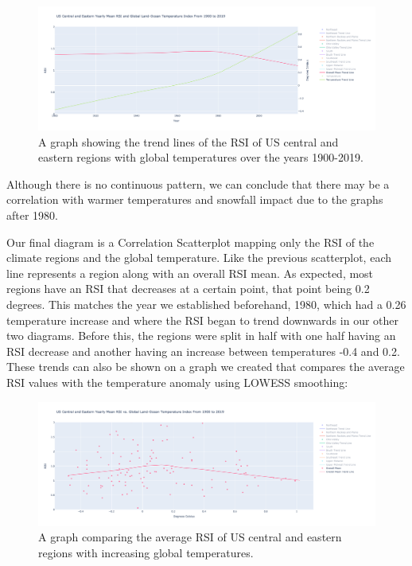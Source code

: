 \documentclass[fontsize=11pt]{article}
\begin{document}
\begin{figure}[h]
    \centering 
    \includegraphics[scale=.2]{year_comparison_scatter_plot_summary_wide.png}
    \caption{A graph showing the trend lines of the RSI of US central and eastern regions with global temperatures over the years 1900-2019.}
    \label{fig:my_label}
\end{figure}

Although there is no continuous pattern, we can conclude that there may be a correlation with warmer temperatures and snowfall impact due to the graphs after 1980.

Our final diagram is a Correlation Scatterplot mapping only the RSI of the climate regions and the global temperature. Like the previous scatterplot, each line represents a region along with an overall RSI mean. As expected, most regions have an RSI that decreases at a certain point, that point being 0.2 degrees. This matches the year we established beforehand, 1980, which had a 0.26 temperature increase and where the RSI began to trend downwards in our other two diagrams. Before this, the regions were split in half with one half having an RSI decrease and another having an increase between temperatures -0.4 and 0.2. These trends can also be shown on a graph we created that compares the average RSI values with the temperature anomaly using LOWESS smoothing:

\begin{figure}[h]
    \centering 
    \includegraphics[scale=.2]{correlation_scatter_plot_summary_wide.png}
    \caption{A graph comparing the average RSI of US central and eastern regions with increasing global temperatures.}
    \label{fig:my_label}
\end{figure}
\end{document}
